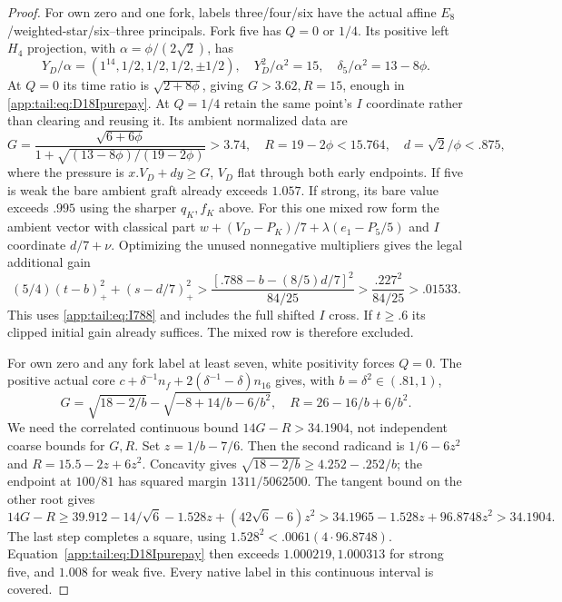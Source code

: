 \documentclass[11pt]{article}
\theoremstyle{definition}
\theoremstyle{remark}
\begin{document}
\begin{proof}
For own zero and one fork, labels three/four/six have the
actual affine $E_8$/weighted-star/six--three principals.
Fork five has $Q=0$ or $1/4$. Its positive left $H_4$
projection, with $\alpha=\phi/(2\sqrt2)$, has
\[
 Y_D/\alpha=(1^{14},1/2,1/2,1/2,\pm1/2),\quad
 Y_D^2/\alpha^2=15,\quad \delta_5/\alpha^2=13-8\phi.
\]
At $Q=0$ its time ratio is $\sqrt{2+8\phi}$, giving
$G>3.62,R=15$, enough in \eqref{app:tail:eq:D18Ipurepay}.
At $Q=1/4$ retain the same point's $I$ coordinate rather
than clearing and reusing it. Its ambient normalized data are
\[
 G={\frac{\sqrt{6+6\phi}}{1+\sqrt{(13-8\phi)/(19-2\phi)}}}>3.74,
 \quad R=19-2\phi<15.764,\quad d=\sqrt2/\phi<.875,
\]
where the pressure is $x.V_D+d y\ge G$, $V_D$ flat through
both early endpoints. If five is weak the bare ambient graft
already exceeds $1.057$. If strong, its bare value exceeds
$.995$ using the sharper $q_K,f_K$ above.
For this one mixed row form the ambient vector with classical
part $w+(V_D-P_K)/7+\lambda(e_1-P_5/5)$ and $I$ coordinate
$d/7+\nu$. Optimizing the unused nonnegative multipliers
gives the legal additional gain
\[
 (5/4)(t-b)_+^2+(s-d/7)_+^2
 >{\frac{[.788-b-(8/5)d/7]^2}{84/25}}
 >{\frac{.227^2}{84/25}}>.01533.
\]
This uses \eqref{app:tail:eq:I788} and includes the full
shifted $I$ cross. If $t\ge.6$ its clipped initial gain
already suffices. The mixed row is therefore excluded.

For own zero and any fork label at least seven, white
positivity forces $Q=0$. The positive actual core
$c+\delta^{-1}n_f+2(\delta^{-1}-\delta)n_{16}$ gives,
with $b=\delta^2\in(.81,1)$,
\[
 G=\sqrt{18-2/b}-\sqrt{-8+14/b-6/b^2},\quad
 R=26-16/b+6/b^2.
\]
We need the correlated continuous bound $14G-R>34.1904$,
not independent coarse bounds for $G,R$.
Set $z=1/b-7/6$. Then the second radicand is
$1/6-6z^2$ and $R=15.5-2z+6z^2$.
Concavity gives $\sqrt{18-2/b}\ge4.252-.252/b$;
the endpoint at $100/81$ has squared margin $1311/5062500$.
The tangent bound on the other root gives
\[
14G-R\ge39.912-14/\sqrt6-1.528z+(42\sqrt6-6)z^2
>34.1965-1.528z+96.8748z^2>34.1904.
\]
The last step completes a square, using
$1.528^2<.0061(4\cdot96.8748)$.
Equation~\eqref{app:tail:eq:D18Ipurepay} then exceeds
$1.000219,1.000313$ for strong five, and $1.008$ for weak
five. Every native label in this continuous interval is covered.


\end{proof}
\end{document}
